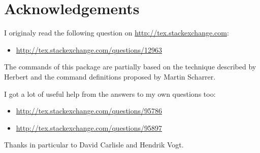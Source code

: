 \documentclass[a4paper]{packagedoc}
\begin{document}
\section{Acknowledgements}                                                     %

I originaly read the following question on \url{http://tex.stackexchange.com}:
\begin{itemize}
  \item \url{http://tex.stackexchange.com/questions/12963}
\end{itemize}
The commands of this package are partially based on the technique described by
Herbert and the command definitions proposed by Martin Scharrer.

I got a lot of useful help from the answers to my own questions too:
\begin{itemize}
  \item \url{http://tex.stackexchange.com/questions/95786}
  \item \url{http://tex.stackexchange.com/questions/95897}
\end{itemize}
Thanks in particular to David Carlisle and Hendrik Vogt.

\end{document}

